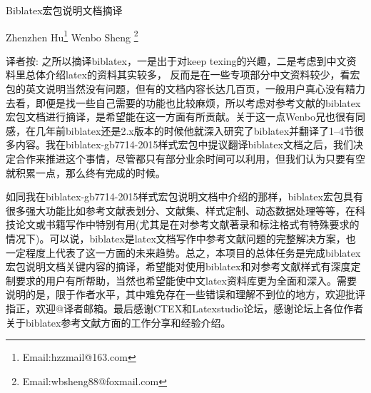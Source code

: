 \documentclass{ltxdockit}[2011/03/25]
\begin{document}
\printtitlepage

\begin{trivlist}\setlength{\parskip}{2mm}\setlength{\itemindent}{2em}\item\relax
	{\hfill\heiti{}Biblatex宏包说明文档摘译 \hfill\hspace*{1pt}}\par
	{\hfill\fangsong{}Zhenzhen Hu\footnote{Email:hzzmail@163.com}\hspace*{1cm}%
    	Wenbo Sheng \footnote{Email:wbsheng88@foxmail.com}\hfill\hspace*{1pt}}\par
	{\hfill\kaiti{}\hfill\hspace*{1pt}}\par
	{\fangsong{}
译者按:
之所以摘译biblatex，一是出于对keep texing的兴趣，二是考虑到中文资料里总体介绍latex的资料其实较多，
反而是在一些专项部分中文资料较少，看宏包的英文说明当然没有问题，但有的文档内容长达几百页，一般用户真心没有精力去看，即便是找一些自己需要的功能也比较麻烦，所以考虑对参考文献的biblatex宏包文档进行摘译，是希望能在这一方面有所贡献。关于这一点Wenbo兄也很有同感，在几年前biblatex还是2.x版本的时候他就深入研究了biblatex并翻译了1--4节很多内容。我在biblatex-gb7714-2015样式宏包中提议翻译biblatex文档之后，我们决定合作来推进这个事情，尽管都只有部分业余时间可以利用，但我们认为只要有空就积累一点，那么终有完成的时候。

如同我在biblatex-gb7714-2015样式宏包说明文档中介绍的那样，biblatex宏包具有很多强大功能比如参考文献表划分、文献集、样式定制、动态数据处理等等，在科技论文或书籍写作中特别有用(尤其是在对参考文献著录和标注格式有特殊要求的情况下)。可以说，biblatex是latex文档写作中参考文献问题的完整解决方案，也一定程度上代表了这一方面的未来趋势。总之，本项目的总体任务是完成biblatex宏包说明文档关键内容的摘译，希望能对使用biblatex和对参考文献样式有深度定制要求的用户有所帮助，当然也希望能使中文latex资料库更为全面和深入。需要说明的是，限于作者水平，其中难免存在一些错误和理解不到位的地方，欢迎批评指正，欢迎@译者邮箱。最后感谢CTEX和Latexstudio论坛，感谢论坛上各位作者关于biblatex参考文献方面的工作分享和经验介绍。

}
\end{trivlist}
\renewcommand{\contentsname}{目录}
\renewcommand{\listtablename}{表格}
\tableofcontents
\listoftables












\printglossary[type=trans,style=longragged3colborder,nopostdot=true,nogroupskip]%
\end{document}
